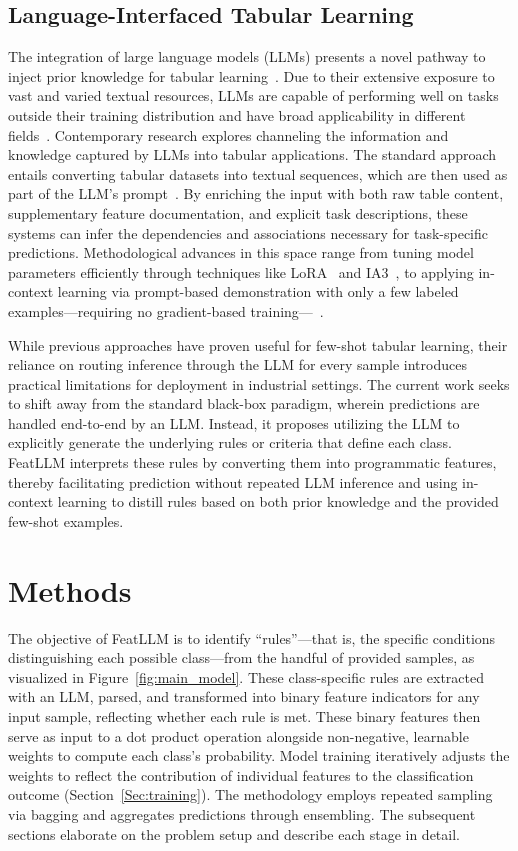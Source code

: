 \subsection{Language-Interfaced Tabular Learning} The integration of large language models (LLMs) presents a novel pathway to inject prior knowledge for tabular learning~\cite{anil2023palm,openai2023gpt4}. Due to their extensive exposure to vast and varied textual resources, LLMs are capable of performing well on tasks outside their training distribution and have broad applicability in different fields~\cite{brown2020language}. Contemporary research explores channeling the information and knowledge captured by LLMs into tabular applications. The standard approach entails converting tabular datasets into textual sequences, which are then used as part of the LLM's prompt~\cite{dinh2022lift,hegselmann2023tabllm,wang2023anypredict}. By enriching the input with both raw table content, supplementary feature documentation, and explicit task descriptions, these systems can infer the dependencies and associations necessary for task-specific predictions. Methodological advances in this space range from tuning model parameters efficiently through techniques like LoRA~\cite{hu2021lora} and IA3~\cite{liu2022few}, to applying in-context learning via prompt-based demonstration with only a few labeled examples—requiring no gradient-based training—~\cite{dinh2022lift,hegselmann2023tabllm,nam2023semi,slack2023tablet}.

While previous approaches have proven useful for few-shot tabular learning, their reliance on routing inference through the LLM for every sample introduces practical limitations for deployment in industrial settings. The current work seeks to shift away from the standard black-box paradigm, wherein predictions are handled end-to-end by an LLM. Instead, it proposes utilizing the LLM to explicitly generate the underlying rules or criteria that define each class. \textsf{FeatLLM} interprets these rules by converting them into programmatic features, thereby facilitating prediction without repeated LLM inference and using in-context learning to distill rules based on both prior knowledge and the provided few-shot examples.

\section{Methods}
The objective of \textsf{FeatLLM} is to identify ``rules''—that is, the specific conditions distinguishing each possible class—from the handful of provided samples, as visualized in Figure~\ref{fig:main_model}. These class-specific rules are extracted with an LLM, parsed, and transformed into binary feature indicators for any input sample, reflecting whether each rule is met. These binary features then serve as input to a dot product operation alongside non-negative, learnable weights to compute each class's probability. Model training iteratively adjusts the weights to reflect the contribution of individual features to the classification outcome (Section~\ref{Sec:training}). The methodology employs repeated sampling via bagging and aggregates predictions through ensembling. The subsequent sections elaborate on the problem setup and describe each stage in detail.

